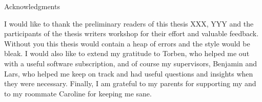 \thispagestyle{empty}

\vspace*{20mm}

\begin{center}
{ Acknowledgments}
\end{center}

\vspace{10mm}


I would like to thank the preliminary readers of this thesis XXX, YYY and the participants of the thesis writers workshop for their effort and valuable feedback.
Without you this thesis would contain a heap of errors and the style would be bleak.
I would also like to extend my gratitude to Torben, who helped me out with a useful software subscription, and of course my supervisors, Benjamin and Lars, who helped me keep on track and had useful questions and insights when they were necessary.
Finally, I am grateful to my parents for supporting my and to my roommate Caroline for keeping me sane.

\cleardoublepage{}
